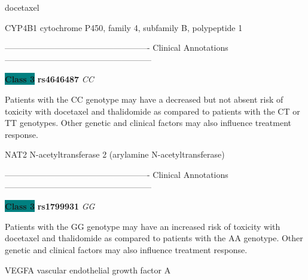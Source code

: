 \documentclass{resume} %
\begin{document}
\begin{rSection}{ docetaxel }
\begin{rSubsection}{ CYP4B1 }{ cytochrome P450, family 4, subfamily B, polypeptide 1 }{}{}
\item[] ---------------------------------------------------- Clinical Annotations -----------------------------------------------------\newline
\item \textbf{\colorbox{teal} {Class 3}} \textbf{ rs4646487 } \textit{ CC }
\item[] Patients with the CC genotype may have a decreased but not absent risk of toxicity with docetaxel and thalidomide as compared to patients with the CT or TT genotypes. Other genetic and clinical factors may also influence treatment response.
\end{rSubsection}\begin{rSubsection}{ NAT2 }{ N-acetyltransferase 2 (arylamine N-acetyltransferase) }{}{}
\item[]

\item[] ---------------------------------------------------- Clinical Annotations -----------------------------------------------------\newline
\item \textbf{\colorbox{teal} {Class 3}} \textbf{ rs1799931 } \textit{ GG }
\item[] Patients with the GG genotype may have an increased risk of toxicity with docetaxel and thalidomide as compared to patients with the AA genotype. Other genetic and clinical factors may also influence treatment response.
\end{rSubsection}\begin{rSubsection}{ VEGFA }{ vascular endothelial growth factor A }{}{}
\item[]


\end{rSubsection}
\end{rSection}
\end{document}
